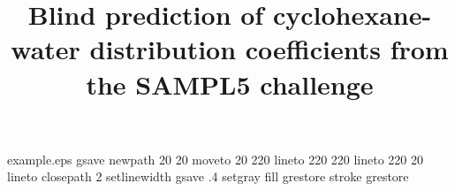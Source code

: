 %
%
%
%
%
\begin{filecontents*}{example.eps}
gsave
newpath
  20 20 moveto
  20 220 lineto
  220 220 lineto
  220 20 lineto
closepath
2 setlinewidth
gsave
  .4 setgray fill
grestore
stroke
grestore
\end{filecontents*}
%
\RequirePackage{fix-cm}
%
\documentclass[smallextended]{svjour3}       %
%
\smartqed  %
%
\usepackage{graphicx}
%
%
%
%
%


\title{Blind prediction of cyclohexane-water distribution coefficients from the SAMPL5 challenge}
\thanks{NSF, green planet (their NSF), anything else?}

